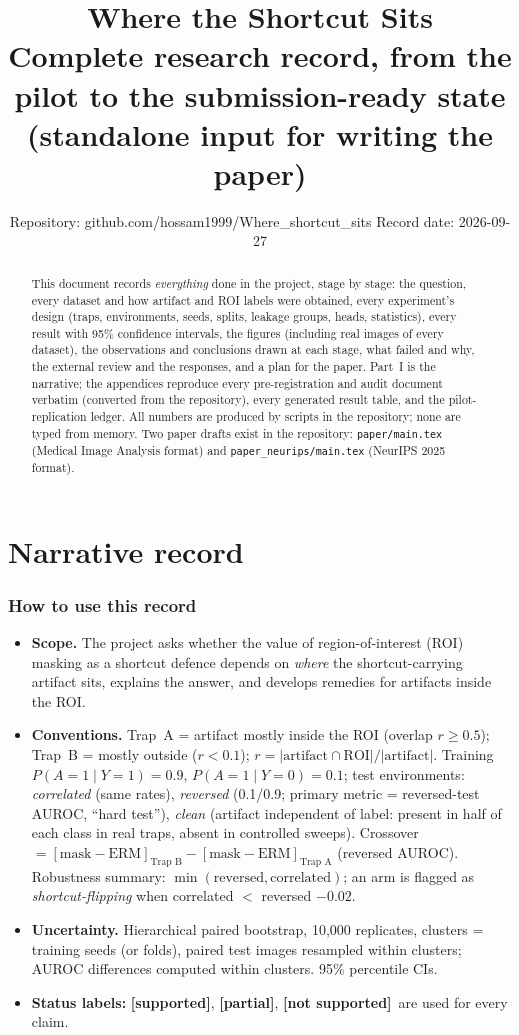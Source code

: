 \documentclass[10pt,a4paper]{article}
\title{\textbf{Where the Shortcut Sits}\\[4pt]\large Complete research record, from the pilot to the submission-ready state\\
(standalone input for writing the paper)}
\author{Repository: github.com/hossam1999/Where\_shortcut\_sits \quad Record date: 2026-09-27}
\date{}
\newcommand{\ok}{\textcolor{green!50!black}{\textbf{[supported]}}}
\newcommand{\no}{\textcolor{red!70!black}{\textbf{[not supported]}}}
\newcommand{\mixed}{\textcolor{orange!80!black}{\textbf{[partial]}}}
\begin{document}
\maketitle
\begin{abstract}
\noindent This document records \emph{everything} done in the project, stage by stage: the question, every dataset and how
artifact and ROI labels were obtained, every experiment's design (traps, environments, seeds, splits, leakage groups,
heads, statistics), every result with 95\% confidence intervals, the figures (including real images of every dataset),
the observations and conclusions drawn at each stage, what failed and why, the external review and the responses, and a
plan for the paper. Part~I is the narrative; the appendices reproduce every pre-registration and audit document
verbatim (converted from the repository), every generated result table, and the pilot-replication ledger. All numbers
are produced by scripts in the repository; none are typed from memory. Two paper drafts exist in the repository:
\texttt{paper/main.tex} (Medical Image Analysis format) and \texttt{paper\_neurips/main.tex} (NeurIPS 2025 format).
\end{abstract}
\setcounter{tocdepth}{2}\tableofcontents
\clearpage

\part{Narrative record}

\section{How to use this record}
\begin{itemize}[leftmargin=*]
\item \textbf{Scope.} The project asks whether the value of region-of-interest (ROI) masking as a shortcut defence depends on
\emph{where} the shortcut-carrying artifact sits, explains the answer, and develops remedies for artifacts inside the ROI.
\item \textbf{Conventions.} Trap~A = artifact mostly inside the ROI (overlap $r\ge0.5$); Trap~B = mostly outside ($r<0.1$);
$r=|\text{artifact}\cap\text{ROI}|/|\text{artifact}|$. Training $P(A{=}1\mid Y{=}1)=0.9$, $P(A{=}1\mid Y{=}0)=0.1$;
test environments: \emph{correlated} (same rates), \emph{reversed} (0.1/0.9; primary metric = reversed-test AUROC, ``hard
test''), \emph{clean} (artifact independent of label: present in half of each class in real traps, absent in controlled
sweeps). Crossover $=[\text{mask}-\text{ERM}]_{\text{Trap B}}-[\text{mask}-\text{ERM}]_{\text{Trap A}}$ (reversed AUROC).
Robustness summary: $\min(\text{reversed},\text{correlated})$; an arm is flagged as \emph{shortcut-flipping} when
correlated $<$ reversed $-0.02$.
\item \textbf{Uncertainty.} Hierarchical paired bootstrap, 10{,}000 replicates, clusters = training seeds (or folds),
paired test images resampled within clusters; AUROC differences computed within clusters. 95\% percentile CIs.
\item \textbf{Status labels:} \ok, \mixed, \no\ are used for every claim.
\end{itemize}
\end{document}

